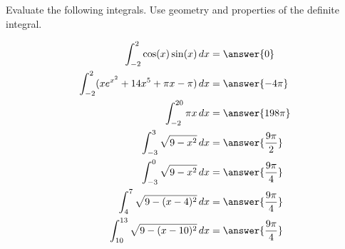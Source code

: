 \documentclass{ximera}
\author{Nela Lakos \and Kyle Parsons}
\begin{document}
\begin{exercise}

Evaluate the following integrals.  Use geometry and properties of the definite integral.

\begin{align*}
\int_{-2}^2 \cos(x)\sin(x) \d x &= \answer{0}\\
\int_{-2}^2 (xe^{x^2} + 14x^5 + \pi x - \pi) \d x &= \answer{-4\pi}\\
\int_{-2}^{20} \pi x \d x &= \answer{198\pi}\\
\int_{-3}^3 \sqrt{9-x^2} \d x &= \answer{\frac{9\pi}{2}}\\
\int_{-3}^0 \sqrt{9-x^2} \d x &= \answer{\frac{9\pi}{4}}\\
\int_4^7 \sqrt{9-(x-4)^2} \d x &= \answer{\frac{9\pi}{4}}\\
\int_{10}^{13} \sqrt{9-(x-10)^2} \d x &= \answer{\frac{9\pi}{4}}
\end{align*}

\end{exercise}
\end{document}
